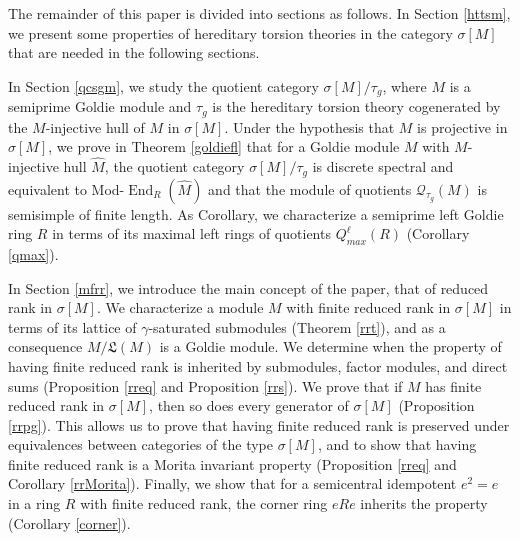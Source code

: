 \documentclass{amsart}
\theoremstyle{definition}
\theoremstyle{remark}
\numberwithin{equation}{section}
\DeclareMathOperator{\End}{End}
\newcommand{\sm}{\sigma[M]}
\begin{document}
	The remainder of this paper is divided into sections as follows. 
	In Section \ref{httsm}, 
	we present some properties of hereditary torsion theories 
	in the category $\sm$ that are needed in the following sections. 
	
	In Section \ref{qcsgm}, we study the quotient category $\sm/\tau_g$, 
	where $M$ is a semiprime Goldie module 
	and $\tau_g$ is the hereditary torsion theory 
	cogenerated by the $M$-injective hull of $M$ in $\sm$. 
	Under the hypothesis that $M$ is projective in $\sm$,
	we prove in Theorem \ref{goldiefl}  
	that for a Goldie module $M$ 
	with $M$-injective hull $\widehat{M}$, 
	the quotient category $\sm/\tau_g$ is discrete spectral 
	and equivalent to Mod-$\End_R(\widehat{M})$ and
	that the module of quotients 
	$\mathcal{Q}_{\tau_g}(M)$ is semisimple of finite length. As Corollary, we characterize a semiprime left Goldie ring $R$ in terms of its maximal left rings of quotients $Q_{max}^\ell(R)$ (Corollary \ref{qmax}).  
	
	In Section \ref{mfrr}, 
	we introduce the main concept of the paper,
	that of reduced rank in $\sm$. 
	We characterize a module $M$ with finite reduced rank in $\sm$ 
	in terms of its lattice of $\gamma$-saturated submodules (Theorem \ref{rrt}), 
	and as a consequence $M/\mathfrak{L}(M)$ is a Goldie module. 
	We determine when the property of having finite reduced rank 
	is inherited by submodules, 
	factor modules, and direct sums 
	(Proposition \ref{rreq} and Proposition \ref{rrs}). 
	We prove that if $M$ has finite reduced rank in $\sm$, 
	then so does every generator of $\sm$ (Proposition \ref{rrpg}). 
	This allows us to prove that 
	having finite reduced rank is preserved 
	under equivalences between categories of the type $\sm$,
	and to show that having finite reduced rank 
	is a Morita invariant property 
	(Proposition \ref{rreq} and Corollary \ref{rrMorita}). 
	Finally, we show that for a semicentral idempotent $e^2=e$ in a ring $R$ 
	with finite reduced rank, 
	the corner ring $eRe$ 
	inherits the property (Corollary \ref{corner}). 
	
\end{document}
